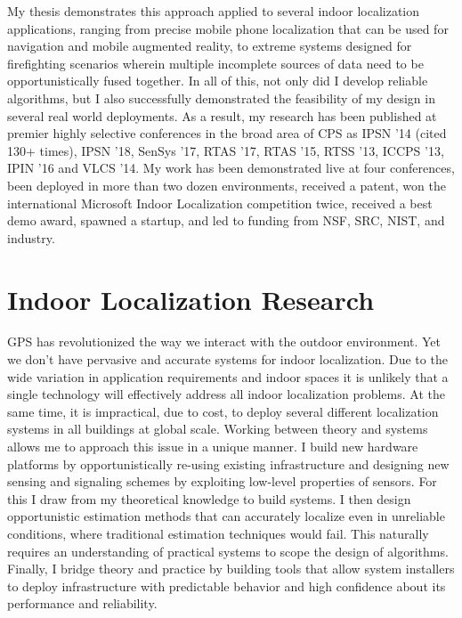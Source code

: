 \documentclass[10pt]{article}
\begin{document}
My thesis demonstrates this approach applied to several indoor localization applications, ranging from precise mobile phone localization that can be used for navigation and mobile augmented reality, to extreme systems designed for firefighting scenarios wherein multiple incomplete sources of data need to be opportunistically fused together. 
In all of this, not only did I develop reliable algorithms, but I also successfully demonstrated the feasibility of my design in several real world deployments.
As a result, my research has been published at premier highly selective conferences in the broad area of CPS as IPSN '14 (cited 130+ times), IPSN '18, SenSys '17, RTAS '17, RTAS '15,  RTSS '13, ICCPS '13, IPIN '16 and VLCS '14. My work has been demonstrated live at four conferences, been deployed in more than two dozen environments, received a patent, won the international Microsoft Indoor Localization competition twice, received a best demo award, spawned a startup, and led to funding from NSF, SRC, NIST, and industry.



\section{Indoor Localization Research}

GPS has revolutionized the way we interact with the outdoor environment.  %
Yet we don't have pervasive and accurate systems for indoor localization.  
Due to the wide variation in application requirements and indoor spaces it is unlikely that a single technology will effectively address all indoor localization problems.  At the same time, it is impractical, due to cost, to deploy several different localization systems in all buildings at global scale. %
Working between theory and systems allows me to approach this issue in a unique manner. I build new hardware platforms by opportunistically re-using existing infrastructure and designing new sensing and signaling schemes by exploiting low-level properties of sensors. For this I draw from my theoretical knowledge to build systems. I then design opportunistic estimation methods that can accurately localize even in unreliable conditions, where traditional estimation techniques would fail. This naturally requires an understanding of practical systems to scope the design of algorithms. Finally, I bridge theory and practice by building tools that allow system installers to deploy infrastructure with predictable behavior and high confidence about its performance and reliability.  
\end{document}
